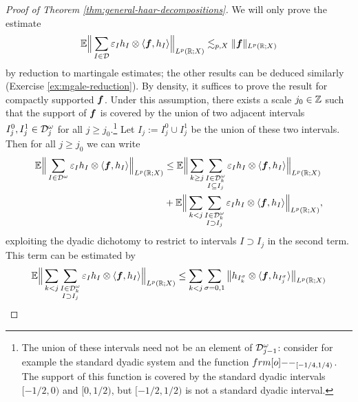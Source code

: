\begin{proof}[Proof of Theorem \ref{thm:general-haar-decompositions}]
  We will only prove the estimate
  \begin{equation*}
    \mathbb{E} \Big\| \sum_{I \in \mathcal{D}} \varepsilon_{I} h_{I} \otimes \langle \bm{f}, h_{I} \rangle \Big\|_{L^p(\mathbb{R};X)} \lesssim_{p,X}     \|\bm{f}\|_{L^p(\mathbb{R};X)}
  \end{equation*}
  by reduction to martingale estimates; the other results can be deduced similarly (Exercise \ref{ex:mgale-reduction}).
  By density, it suffices to prove the result for compactly supported $\bm{f}$.
  Under this assumption, there exists a scale $j_{0} \in \mathbb{Z}$ such that the support of $\bm{f}$ is covered by the union of two adjacent intervals $I_{j}^{0}, I_{j}^{1} \in \mathcal{D}^{\omega}_{j}$ for all $j \geq j_{0}$.\footnote{The union of these intervals need not be an element of $\mathcal{D}^{\omega}_{j-1}$: consider for example the standard dyadic system and the function $\1_{[-1/4,1/4)}$.
    The support of this function is covered by the standard dyadic intervals $[-1/2,0)$ and $[0,1/2)$, but $[-1/2,1/2)$ is not a standard dyadic interval.}
  Let $I_{j} := I_{j}^{0} \cup I_{j}^{1}$ be the union of these two intervals.
  Then for all $j \geq j_{0}$ we can write
  \begin{equation*}
    \begin{aligned}
      \mathbb{E} \Big\| \sum_{I \in \mathcal{D}^{\omega}} \varepsilon_{I} h_{I} \otimes \langle \bm{f}, h_{I} \rangle \Big\|_{L^p(\mathbb{R};X)}
      &\leq \mathbb{E} \Big\| \sum_{k \geq j} \sum_{\substack{I \in \mathcal{D}_{k}^{\omega} \\ I \subseteq I_{j}}} \varepsilon_{I} h_{I} \otimes \langle \bm{f}, h_{I} \rangle \Big\|_{L^p(\mathbb{R};X)} \\
      &+ \mathbb{E} \Big\| \sum_{k < j} \sum_{\substack{I \in \mathcal{D}_{k}^{\omega} \\ I \supset I_{j}}} \varepsilon_{I} h_{I} \otimes \langle \bm{f}, h_{I} \rangle \Big\|_{L^p(\mathbb{R};X)},
    \end{aligned}
  \end{equation*}
  exploiting the dyadic dichotomy to restrict to intervals $I \supset I_{j}$ in the second term.
  This term can be estimated by
  \begin{equation*}
    \begin{aligned}
      \E \Big\| \sum_{k < j} \sum_{\substack{I \in \mc{D}_{k}^{\omega} \\ I \supset I_{j}}} \varepsilon_{I} h_{I} \otimes \langle \mb{f}, h_{I} \rangle \Big\|_{L^p(\R;X)}
      &\leq \sum_{k < j} \sum_{\sigma = 0,1} \big\| h_{I^{\sigma}_{k}} \otimes \langle \mb{f}, h_{I^{\sigma}_{j}} \rangle \big\|_{L^p(\R;X)} \\

\end{aligned}
\end{equation*}
\end{proof}
